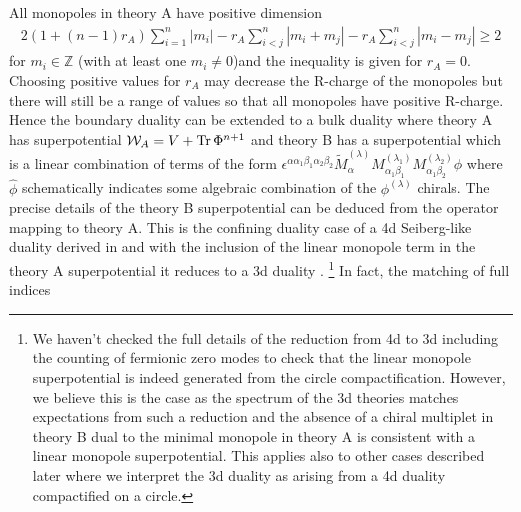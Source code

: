 \documentclass[12pt]{article}
\newcommand{\Zb}{\mathbb{Z}}
\newcommand{\Wcal}{\mathcal{W}}
\DeclareMathOperator*{\Tr}{{\rm Tr}}
\numberwithin{equation}{section}
\begin{document}
All monopoles in theory A have positive dimension
\begin{align}
\label{Mono_Ch_usp2n_6_1}
    2(1 + (n-1)r_A) \sum_{i = 1}^n|m_i| - r_A \sum_{i<j}^n |m_i + m_j| - r_A \sum_{i<j}^n |m_i - m_j| \ge 2
\end{align}
for $m_i \in \Zb$ (with at least one $m_i \ne 0$)and the inequality is given for $r_A = 0$. Choosing positive values for $r_A$ may decrease the R-charge of the monopoles but there will still be a range of values so that all monopoles have positive R-charge. 
Hence the boundary duality can be extended to a bulk duality where theory A has superpotential $\Wcal_A = V + \Tr \Phi^{n+1}$ and theory B has a superpotential which is a linear combination of terms of the form $\epsilon^{\alpha \alpha_1 \beta_1 \alpha_2 \beta_2} \widetilde{M}_{\alpha}^{(\lambda)} M_{\alpha_1 \beta_1}^{(\lambda_1)} M_{\alpha_1 \beta_2}^{(\lambda_2)} \widehat{\phi}$ where $\widehat{\phi}$ schematically indicates some algebraic combination of the $\phi^{(\lambda)}$ chirals. The precise details of the theory B superpotential can be deduced from the operator mapping to theory A. This is the confining duality case of a 4d Seiberg-like duality derived in \cite{Intriligator:1995ff, Intriligator:1995ax} and with the inclusion of the linear monopole term in the theory A superpotential it reduces to a 3d duality \cite{Aharony:2013dha}. \footnote{We haven't checked the full details of the reduction from 4d to 3d including the counting of fermionic zero modes to check that the linear monopole superpotential is indeed generated from the circle compactification. However, we believe this is the case as the spectrum of the 3d theories matches expectations from such a reduction and the absence of a chiral multiplet in theory B dual to the minimal monopole in theory A is consistent with a linear monopole superpotential. This applies also to other cases described later where we interpret the 3d duality as arising from a 4d duality compactified on a circle.}
In fact, the matching of full indices 
\end{document}
